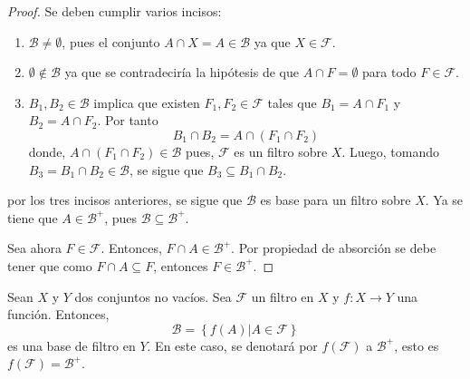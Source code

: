 \documentclass[12pt]{report}
\theoremstyle{largebreak}
\newcommand\cf[3]{\ensuremath{#1:#2\rightarrow#3}}
\begin{document}
    \begin{proof}
        Se deben cumplir varios incisos:
        \begin{enumerate}
            \item $\mathcal{B}\neq\emptyset$, pues el conjunto $A\cap X=A\in\mathcal{B}$ ya que $X\in\mathcal{F}$.
            \item $\emptyset\notin\mathcal{B}$ ya que se contradeciría la hipótesis de que $A\cap F=\emptyset$ para todo $F\in\mathcal{F}$.
            \item $B_1,B_2\in\mathcal{B}$ implica que existen $F_1,F_2\in\mathcal{F}$ tales que $B_1=A\cap F_1$ y $B_2= A\cap F_2$. Por tanto
            \begin{equation*}
                B_1\cap B_2=A\cap (F_1\cap F_2)
            \end{equation*}
            donde, $A\cap(F_1\cap F_2)\in\mathcal{B}$ pues, $\mathcal{F}$ es un filtro sobre $X$. Luego, tomando $B_3=B_1\cap B_2\in\mathcal{B}$, se sigue que $B_3\subseteq B_1\cap B_2$.
        \end{enumerate}
        por los tres incisos anteriores, se sigue que $\mathcal{B}$ es base para un filtro sobre $X$. Ya se tiene que $A\in\mathcal{B}^+$, pues $\mathcal{B}\subseteq\mathcal{B}^+$.

        Sea ahora $F\in\mathcal{F}$. Entonces, $F\cap A\in\mathcal{B}^+$. Por propiedad de absorción se debe tener que como $F\cap A\subseteq F$, entonces $F\in\mathcal{B}^+$.
    \end{proof}

    \begin{propo}
        Sean $X$ y $Y$ dos conjuntos no vacíos. Sea $\mathcal{F}$ un filtro en $X$ y $\cf{f}{X}{Y}$ una función. Entonces,
        \begin{equation*}
            \mathcal{B}=\left\{f(A)\Big|A\in\mathcal{F} \right\}
        \end{equation*}
        es una base de filtro en $Y$. En este caso, se denotará por $f(\mathcal{F})$ a $\mathcal{B}^+$, esto es $f(\mathcal{F})=\mathcal{B}^+$.
    \end{propo}
\end{document}
